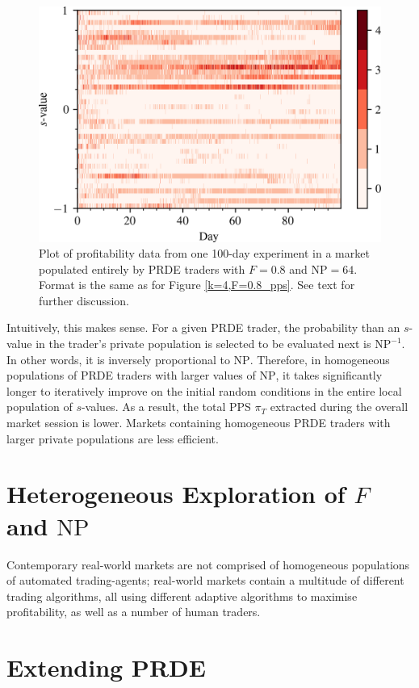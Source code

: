 \documentclass[conference]{IEEEtran}
\begin{document}
\begin{figure}[htbp]
    \centerline{\includegraphics[width=\columnwidth]{k=14,F=0.0_buy_strats.png}}
    \caption{
        Plot of profitability data from one 100-day experiment in a market populated entirely by PRDE traders with $F=0.8$ and $\mathrm{NP}=64$.
        Format is the same as for Figure \ref{k=4,F=0.8_pps}.
        See text for further discussion.
    }
    \label{k=64,F=0.8_pps}
\end{figure}

Intuitively, this makes sense.
For a given PRDE trader, the probability than an $s$-value in the trader's private population is selected to be evaluated next is $\mathrm{NP}^{-1}$.
In other words, it is inversely proportional to $\mathrm{NP}$.
Therefore, in homogeneous populations of PRDE traders with larger values of $\mathrm{NP}$, it takes significantly longer to iteratively improve on the initial random conditions in the entire local population of $s$-values.
As a result, the total PPS $\pi_T$ extracted during the overall market session is lower.
Markets containing homogeneous PRDE traders with larger private populations are less efficient.




\section{Heterogeneous Exploration of $F$ and $\mathrm{NP}$}

Contemporary real-world markets are not comprised of homogeneous populations of automated trading-agents; real-world markets contain a multitude of different trading algorithms, all using different adaptive algorithms to maximise profitability, as well as a number of human traders.

\section{Extending PRDE}



\end{document}
